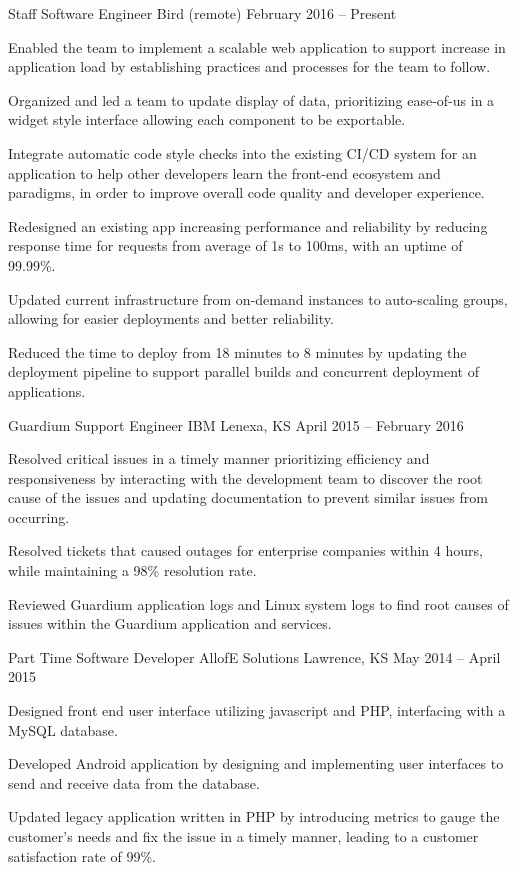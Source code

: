\begin{cventries}
	\cventry
	{Staff Software Engineer}
	{Bird}
	{(remote)}
	{February 2016 – Present}
	{\begin{cvitems}
		\item {Enabled the team to implement a scalable web application to support increase in application load by establishing practices and processes for the team to follow.}
		\item {Organized and led a team to update display of data, prioritizing ease-of-us in a widget style interface allowing each component to be exportable.}
		\item {Integrate automatic code style checks into the existing CI/CD system for an application to help other developers learn the front-end ecosystem and paradigms, in order to improve overall code quality and developer experience.}
		\item {Redesigned an existing app increasing performance and reliability by reducing response time for requests from average of 1s to 100ms, with an uptime of 99.99\%.}
		\item {Updated current infrastructure from on-demand instances to auto-scaling groups, allowing for easier deployments and better reliability.}
		\item {Reduced the time to deploy from 18 minutes to 8 minutes by updating the deployment pipeline to support parallel builds and concurrent deployment of applications.}
		\end{cvitems}}
	\cventry
	{Guardium Support Engineer}
	{IBM}
	{Lenexa, KS}
	{April 2015 – February 2016}
	{\begin{cvitems}
		\item {Resolved critical issues in a timely manner prioritizing efficiency and responsiveness by interacting with the development team to discover the root cause of the issues and updating documentation to prevent similar issues from occurring.}
		\item {Resolved tickets that caused outages for enterprise companies within 4 hours, while maintaining a 98\% resolution rate.}
		\item {Reviewed Guardium application logs and Linux system logs to find root causes of issues within the Guardium application and services.}
		\end{cvitems}}
	\cventry
	{Part Time Software Developer}
	{AllofE Solutions}
	{Lawrence, KS}
	{May 2014 – April 2015}
	{\begin{cvitems}
		\item {Designed front end user interface utilizing javascript and PHP, interfacing with a MySQL database.}
		\item {Developed Android application by designing and implementing user interfaces to send and receive data from the database.}
		\item {Updated legacy application written in PHP by introducing metrics to gauge the customer’s needs and fix the issue in a timely manner, leading to a customer satisfaction rate of 99\%.}
		\end{cvitems}}
\end{cventries}

\vspace{-3mm}
